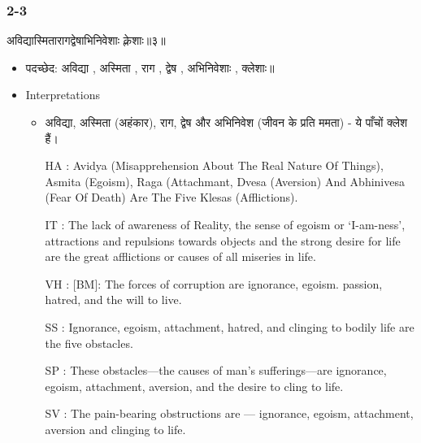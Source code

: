 \begin{frame}[fragile]\frametitle{2-3}
\begin{sanskrit}
अविद्यास्मितारागद्वेषाभिनिवेशाः क्लेशाः॥३॥
\end{sanskrit}

	\begin{itemize}
	\item पदच्छेद: अविद्या , अस्मिता , राग , द्वेष , अभिनिवेशाः , क्लेशाः॥
	\item Interpretations
		\begin{itemize}
		\item अविद्या, अस्मिता (अहंकार), राग, द्वेष और अभिनिवेश (जीवन के प्रति ममता) - ये पाँचों क्लेश हैं।
		\item [HA]: Avidya (Misapprehension About The Real Nature Of Things), Asmita (Egoism), Raga (Attachmant, Dvesa (Aversion) And Abhinivesa (Fear Of Death) Are The Five Klesas (Afflictions).
		\item [IT]: The lack of awareness of Reality, the sense of egoism or ‘I-am-ness’, attractions and repulsions towards objects and the strong desire for life are the great afflictions or causes of all miseries in life.
		\item [VH]: [BM]: The forces of corruption are ignorance, egoism. passion, hatred, and the will to live.
		\item [SS]: Ignorance, egoism, attachment, hatred, and clinging to bodily life are the five obstacles.
		\item [SP]: These obstacles—the causes of man’s sufferings—are ignorance, egoism, attachment, aversion, and the desire to cling to life.
		\item [SV]: The pain-bearing obstructions are — ignorance, egoism, attachment, aversion and clinging to life. 
		\end{itemize}
	\end{itemize}
	
\end{frame}

